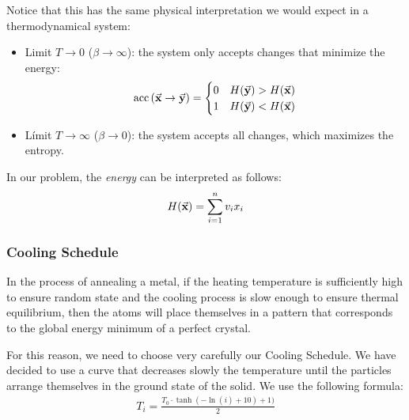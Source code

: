 Notice that this has the same physical interpretation we would expect in a thermodynamical system:
\begin{itemize}
	\item Limit $T \to 0$ ($\beta \to \infty$): the system only accepts changes that minimize the energy:
	\begin{align*}
		\operatorname{acc}\qty(\va{x} \to \va{y}) =
		\begin{cases}
			0 & H(\va{y}) > H(\va{x}) \\
			1 & H(\va{y}) < H(\va{x})
		\end{cases}
	\end{align*}
	\item Límit $T \to \infty$ ($\beta \to 0$): the system accepts all changes, which maximizes the entropy.
\end{itemize}

In our problem, the \emph{energy} can be interpreted as follows:
\begin{align}
    H(\va{x}) = \displaystyle \sum_{i=1}^{n} v_i x_i
\end{align}

\subsubsection*{Cooling Schedule}
In the process of annealing a metal, if the heating temperature is sufficiently high to ensure random state and the cooling process is slow enough to ensure thermal equilibrium, then the atoms will place themselves in a pattern that corresponds to the global energy minimum of a perfect crystal.

For this reason, we need to choose very carefully our Cooling Schedule. We have decided to use a curve that decreases slowly the temperature until the particles arrange themselves in the ground state of the solid. We use the following formula:
\begin{align}
    T_{i} = \frac{T_{0} \cdot \tanh(- \ln(i) + 10) + 1 )}{2} 
\end{align}

